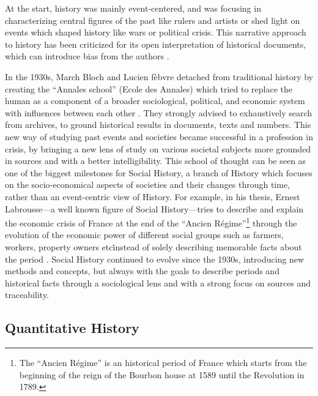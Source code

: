 At the start, history was mainly event-centered, and was focusing in characterizing central figures of the past like rulers and artists or shed light on events which shaped history like wars or political crisis.
This narrative approach to history has been criticized for its open interpretation of historical documents, which can introduce bias from the authors \cite{bourdieuRapportsEntreSociologie1995}.

In the 1930s, March Bloch and Lucien fèbvre detached from traditional history by creating the ``Annales school'' (Ecole des Annales) which tried to replace the human as a component of a broader sociological, political, and economic system with influences between each other \cite{burkeHistorySocialTheory2005}.
They strongly advised to exhaustively search from archives, to ground historical results in documents, texts and numbers.
This new way of studying past events and societies became successful in a profession in crisis, by bringing a new lens of study on various societal subjects more grounded in sources and with a better intelligibility.
This school of thought can be seen as one of the biggest milestones for Social History, a branch of History which focuses on the socio-economical aspects of societies and their changes through time, rather than an event-centric view of History.
For example, in his thesis, Ernest Labrousse---a well known figure of Social History---tries to describe and explain the economic crisis of France at the end of the ``Ancien Régime''\footnote{The ``Ancien Régime'' is an historical period of France which starts from the beginning of the reign of the Bourbon house at 1589 until the Revolution in 1789.} through the evolution of the economic power of different social groups such as farmers, workers, property owners etc\. instead of solely describing memorable facts about the period \cite{labrousse1990crise}.
Social History continued to evolve since the 1930s, introducing new methods and concepts, but always with the goals to describe periods and historical facts through a sociological lens and with a strong focus on sources and traceability.


\subsection{Quantitative History}\label{subsec:quantitative-history}

